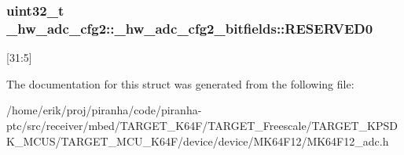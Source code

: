 \subsubsection[{\texorpdfstring{R\+E\+S\+E\+R\+V\+E\+D0}{RESERVED0}}]{\setlength{\rightskip}{0pt plus 5cm}uint32\+\_\+t \+\_\+hw\+\_\+adc\+\_\+cfg2\+::\+\_\+hw\+\_\+adc\+\_\+cfg2\+\_\+bitfields\+::\+R\+E\+S\+E\+R\+V\+E\+D0}\hypertarget{struct__hw__adc__cfg2_1_1__hw__adc__cfg2__bitfields_a954acbb2c955057b104e9c8790cdb4fb}{}\label{struct__hw__adc__cfg2_1_1__hw__adc__cfg2__bitfields_a954acbb2c955057b104e9c8790cdb4fb}
\mbox{[}31\+:5\mbox{]} 

The documentation for this struct was generated from the following file\+:\begin{DoxyCompactItemize}
\item 
/home/erik/proj/piranha/code/piranha-\/ptc/src/receiver/mbed/\+T\+A\+R\+G\+E\+T\+\_\+\+K64\+F/\+T\+A\+R\+G\+E\+T\+\_\+\+Freescale/\+T\+A\+R\+G\+E\+T\+\_\+\+K\+P\+S\+D\+K\+\_\+\+M\+C\+U\+S/\+T\+A\+R\+G\+E\+T\+\_\+\+M\+C\+U\+\_\+\+K64\+F/device/device/\+M\+K64\+F12/M\+K64\+F12\+\_\+adc.\+h\end{DoxyCompactItemize}
